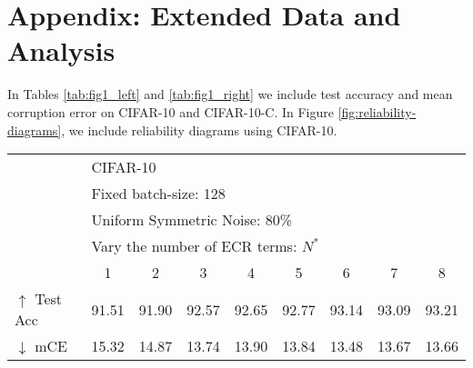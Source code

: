 \documentclass{article}
\begin{document}
\section{Appendix: Extended Data and Analysis}
\label{sec:ablation_more_data}

In Tables \ref{tab:fig1_left} and \ref{tab:fig1_right} we include test accuracy and mean corruption error on CIFAR-10 and CIFAR-10-C. In Figure \ref{fig:reliability-diagrams}, we include reliability diagrams using CIFAR-10.

\begin{table*}[h]
    \renewcommand{\arraystretch}{1.3}
    \centering
    \caption{RTE test accuracy and mean corruption error (mCE) on CIFAR-10 and CIFAR-10-C, respectively.  In this experiment, fixed batch size of $bs=128$ is used and the number of ECR terms, $N^*$ is varied.  Training configuration of these data is described in section \ref{sec:expt:us}.  Test accuracy is presented in Figure \ref{fig:ecr_term_batch_size} (left).}\begin{tabular}{lcccccccc}
        \toprule
        &\multicolumn{8}{l}{CIFAR-10} \\
        &\multicolumn{8}{l}{Fixed batch-size: 128} \\
        &\multicolumn{8}{l}{Uniform Symmetric Noise: 80\%} \\
        \hline
        &\multicolumn{8}{l}{Vary the number of ECR terms: $N^*$} \\
         & 1 & 2 & 3 & 4 & 5 & 6 & 7 & 8 \\
         \hline
         $\uparrow$ Test Acc & 91.51 & 91.90 & 92.57 & 92.65 & 92.77  & 93.14 & 93.09 & 93.21 \\
         $\downarrow$ mCE & 15.32 & 14.87 & 13.74 & 13.90 & 13.84 & 13.48 & 13.67 & 13.66 \\
         \bottomrule
    \end{tabular}
    \label{tab:fig1_left}
\end{table*}
\end{document}
